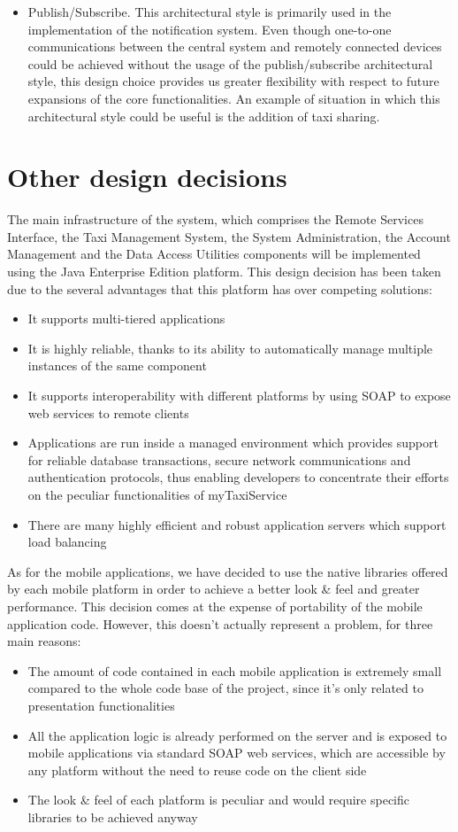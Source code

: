 \begin{itemize}
	\item Publish/Subscribe. This architectural style is primarily used in the implementation of the notification system. Even though one-to-one communications between the central system and remotely connected devices could be achieved without the usage of the publish/subscribe architectural style, this design choice provides us greater flexibility with respect to future expansions of the core functionalities. An example of situation in which this architectural style could be useful is the addition of taxi sharing.
\end{itemize}

\section{Other design decisions}
The main infrastructure of the system, which comprises the Remote Services Interface, the Taxi Management System, the System Administration, the Account Management and the Data Access Utilities components will be implemented using the Java Enterprise Edition platform. This design decision has been taken due to the several advantages that this platform has over competing solutions:
\begin{itemize}
	\item It supports multi-tiered applications
	\item It is highly reliable, thanks to its ability to automatically manage multiple instances of the same component
	\item It supports interoperability with different platforms by using SOAP to expose web services to remote clients 
	\item Applications are run inside a managed environment which provides support for reliable database transactions, secure network communications and authentication protocols, thus enabling developers to concentrate their efforts on the peculiar functionalities of myTaxiService
	\item There are many highly efficient and robust application servers which support load balancing
\end{itemize}

As for the mobile applications, we have decided to use the native libraries offered by each mobile platform in order to achieve a better look \& feel and greater performance. This decision comes at the expense of portability of the mobile application code. However, this doesn't actually represent a problem, for three main reasons:
\begin{itemize}
	\item The amount of code contained in each mobile application is extremely small compared to the whole code base of the project, since it's only related to presentation functionalities
	\item All the application logic is already performed on the server and is exposed to mobile applications via standard SOAP web services, which are accessible by any platform without the need to reuse code on the client side
	\item The look \& feel of each platform is peculiar and would require specific libraries to be achieved anyway 
\end{itemize}

